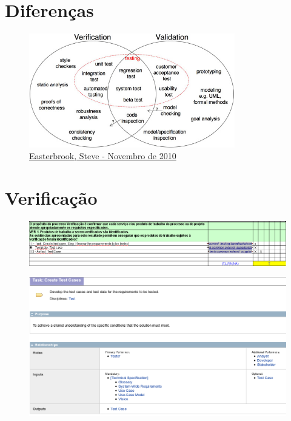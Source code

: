 
\section{Diferenças} %
\label{sec:diferen_as}

\begin{frame}
\begin{figure}[p]
    \centering
    \includegraphics[width=0.8\textwidth]{conteudo/VandVtoolbox.jpg}
    \caption{\href{http://www.easterbrook.ca/steve/2010/11/the-difference-between-verification-and-validation/}{Easterbrook, Steve - Novembro de 2010}}	
    \label{fig:Pattern}
\end{figure}
\end{frame}

\section{Verificação} %
\label{sec:verifica_o}

\begin{frame}
\begin{figure}[p]
    \centering
    \includegraphics[width=\textwidth]{conteudo/VER1-uc}
    \label{fig:Pattern}
\end{figure}	
\end{frame}
\begin{frame}
\begin{figure}[p]
    \centering
    \includegraphics[width=\textwidth]{conteudo/task-uc}
    \label{fig:Pattern}
\end{figure}	
\end{frame}


